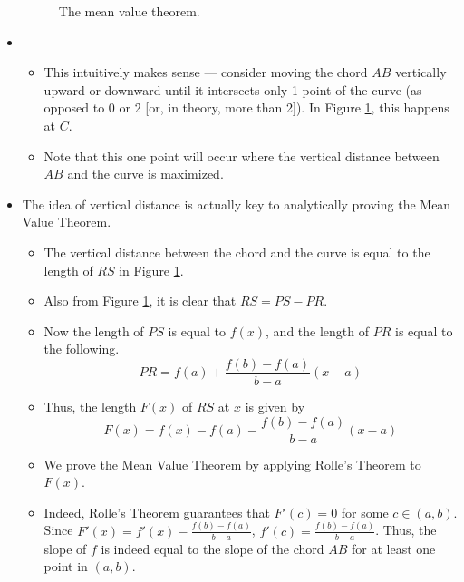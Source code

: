 \documentclass[../main.tex]{subfiles}
\begin{document}
\begin{itemize}
\begin{figure}[h!]
        \caption{The mean value theorem.}
        \label{fig:meanValueTheorem}
    \end{figure}
    \item {}
    \begin{itemize}
        \item This intuitively makes sense --- consider moving the chord $AB$ vertically upward or downward until it intersects only 1 point of the curve (as opposed to 0 or 2 [or, in theory, more than 2]). In Figure \ref{fig:meanValueTheorem}, this happens at $C$.
        \item Note that this one point will occur where the vertical distance between $AB$ and the curve is maximized.
    \end{itemize}
    \item The idea of vertical distance is actually key to analytically proving the Mean Value Theorem.
    \begin{itemize}
        \item The vertical distance between the chord and the curve is equal to the length of $RS$ in Figure \ref{fig:meanValueTheorem}.
        \item Also from Figure \ref{fig:meanValueTheorem}, it is clear that $RS=PS-PR$.
        \item Now the length of $PS$ is equal to $f(x)$, and the length of $PR$ is equal to the following.
        \begin{equation*}
            PR = f(a)+\frac{f(b)-f(a)}{b-a}(x-a)
        \end{equation*}
        \item Thus, the length $F(x)$ of $RS$ at $x$ is given by
        \begin{equation*}
            F(x) = f(x)-f(a)-\frac{f(b)-f(a)}{b-a}(x-a)
        \end{equation*}
        \item We prove the Mean Value Theorem by applying Rolle's Theorem to $F(x)$.
        \item Indeed, Rolle's Theorem guarantees that $F'(c)=0$ for some $c\in(a,b)$. Since $F'(x)=f'(x)-\frac{f(b)-f(a)}{b-a}$, $f'(c)=\frac{f(b)-f(a)}{b-a}$. Thus, the slope of $f$ is indeed equal to the slope of the chord $AB$ for at least one point in $(a,b)$.

\end{itemize}
\end{itemize}
\end{document}
